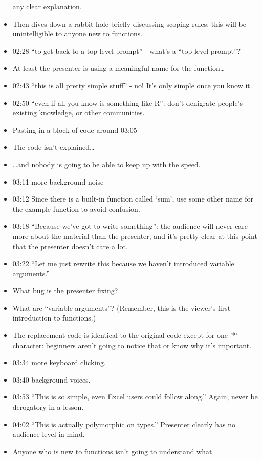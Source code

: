 \documentclass[10pt,statementpaper]{memoir}
\begin{document}
\begin{itemize}
  any clear explanation.
\item
  Then dives down a rabbit hole briefly discussing scoping rules: this
  will be unintelligible to anyone new to functions.
\item
  02:28 ``to get back to a top-level prompt'' - what's a ``top-level
  prompt''?
\item
  At least the presenter is using a meaningful name for the
  function\ldots{}
\item
  02:43 ``this is all pretty simple stuff'' - no! It's only simple once
  you know it.
\item
  02:50 ``even if all you know is something like R'': don't denigrate
  people's existing knowledge, or other communities.
\item
  Pasting in a block of code around 03:05
\item
  The code isn't explained\ldots{}
\item
  \ldots{}and nobody is going to be able to keep up with the speed.
\item
  03:11 more background noise
\item
  03:12 Since there is a built-in function called `sum', use some other
  name for the example function to avoid confusion.
\item
  03:18 ``Because we've got to write something'': the audience will
  never care more about the material than the presenter, and it's pretty
  clear at this point that the presenter doesn't care a lot.
\item
  03:22 ``Let me just rewrite this because we haven't introduced
  variable arguments.''
\item
  What bug is the presenter fixing?
\item
  What are ``variable arguments''? (Remember, this is the viewer's first
  introduction to functions.)
\item
  The replacement code is identical to the original code except for one
  '*' character: beginners aren't going to notice that or know why it's
  important.
\item
  03:34 more keyboard clicking.
\item
  03:40 background voices.
\item
  03:53 ``This is so simple, even Excel users could follow along.''
  Again, never be derogatory in a lesson.
\item
  04:02 ``This is actually polymorphic on types.'' Presenter clearly has
  no audience level in mind.
\item
  Anyone who is new to functions isn't going to understand what

\end{itemize}
\end{document}

